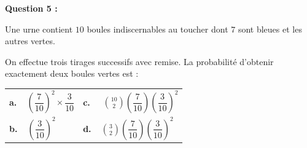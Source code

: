 \documentclass[10pt]{article}
\providecommand{\ds}{\displaystyle}
\begin{document}
\medskip

\textbf{Question 5 :}

\medskip

Une urne contient $10$ boules indiscernables au toucher dont $7$ sont bleues et les autres vertes.

On effectue trois tirages successifs avec remise. La probabilité d'obtenir exactement deux boules vertes est :

\smallskip

\begin{tabularx}{\linewidth}{X X}
\textbf{a.~~}$\left(\dfrac{7}{10}\right)^2 \times \dfrac{3}{10}$&\textbf{c.~~} $\ds\binom{10}{2}\left(\dfrac{7}{10}\right)\left(\dfrac{3}{10}\right)^2$\\
\textbf{b.~~}$\left(\dfrac{3}{10}\right)^2$&\textbf{d.~~}$\ds\binom{3}{2}\left(\dfrac{7}{10}\right)\left(\dfrac{3}{10}\right)^2$
\end{tabularx}

\bigskip
\end{document}
